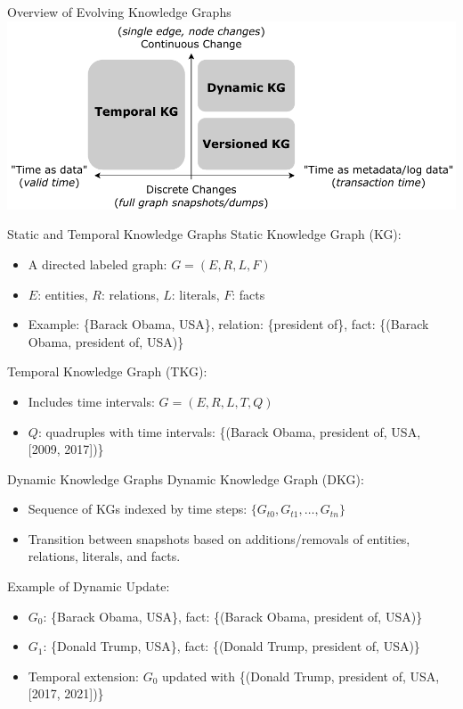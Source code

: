 \documentclass{beamer}
\begin{document}
    \begin{frame}{Overview of Evolving Knowledge Graphs}
        \includegraphics[width=\textwidth]{img/evolving-KGs.png}
    \end{frame}

    \begin{frame}{Static and Temporal Knowledge Graphs}
        Static Knowledge Graph (KG):
        \begin{itemize}
            \item A directed labeled graph: \( G = (E, R, L, F) \)
            \item \( E \): entities, \( R \): relations, \( L \): literals, \( F \): facts
            \item Example: \{Barack Obama, USA\}, relation: \{president of\}, fact: \{(Barack Obama, president of, USA)\}
        \end{itemize}
        Temporal Knowledge Graph (TKG):
        \begin{itemize}
            \item Includes time intervals: \( G = (E, R, L, T, Q) \)
            \item \( Q \): quadruples with time intervals: \{(Barack Obama, president of, USA, [2009, 2017])\}
        \end{itemize}
    \end{frame}

    \begin{frame}{Dynamic Knowledge Graphs}
        Dynamic Knowledge Graph (DKG):
        \begin{itemize}
            \item Sequence of KGs indexed by time steps: \( \{G_{t0}, G_{t1}, \dots, G_{tn}\} \)
            \item Transition between snapshots based on additions/removals of entities, relations, literals, and facts.
        \end{itemize}
        Example of Dynamic Update:
        \begin{itemize}
            \item \( G_0 \): \{Barack Obama, USA\}, fact: \{(Barack Obama, president of, USA)\}
            \item \( G_1 \): \{Donald Trump, USA\}, fact: \{(Donald Trump, president of, USA)\}
            \item Temporal extension: \( G_0 \) updated with \{(Donald Trump, president of, USA, [2017, 2021])\}
        \end{itemize}
    \end{frame}
    
\end{document}

